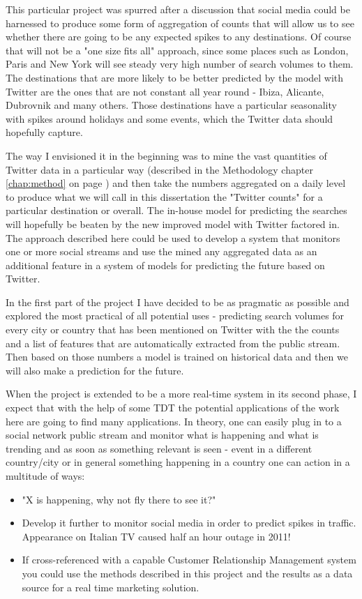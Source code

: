 \documentclass[minf,frontabs,twoside,singlespacing,parskip]{infthesis}
\begin{document}
This particular project was spurred after a discussion that social media could be harnessed to produce some form of aggregation of counts that will allow us to see whether there are going to be any expected spikes to any destinations. Of course that will not be a "one size fits all" approach, since some places such as London, Paris and New York will see steady very high number of search volumes to them. The destinations that are more likely to be better predicted by the model with Twitter are the ones that are not constant all year round - Ibiza, Alicante, Dubrovnik and many others. Those destinations have a particular seasonality with spikes around holidays and some events, which the Twitter data should hopefully capture.


The way I envisioned it in the beginning was to mine the vast quantities of Twitter data in a particular way (described in the Methodology chapter \ref{chap:method} on page \pageref{chap:method}) and then take the numbers aggregated on a daily level to produce what we will call in this dissertation the "Twitter counts" for a particular destination or overall. The in-house model for predicting the searches will hopefully be beaten by the new improved model with Twitter factored in. The approach described here could be used to develop a system that monitors one or more social streams and use the mined any aggregated data as an additional feature in a system of models for predicting the future based on Twitter.


In the first part of the project I have decided to be as pragmatic as possible and explored the most practical of all potential uses - predicting search volumes for every city or country that has been mentioned on Twitter with the the counts and a list of features that are automatically extracted from the public stream. Then based on those numbers a model is trained on historical data and then we will also make a prediction for the future. 


When the project is extended to be a more real-time system in its second phase, I expect that with the help of some TDT the potential applications of the work here are going to find many applications. In theory, one can easily plug in to a social network public stream and monitor what is happening and what is trending and as soon as something relevant is seen - event in a different country/city or in general something happening in a country one can action in a multitude of ways:

\begin{itemize}
\item "X is happening, why not fly there to see it?"
\item Develop it further to monitor social media in order to predict spikes in traffic. Appearance on Italian TV caused half an hour outage in 2011!
\item If cross-referenced with a capable Customer Relationship Management system you could use the methods described in this project and the results as a data source for a real time marketing solution.
\end{itemize}
\end{document}

